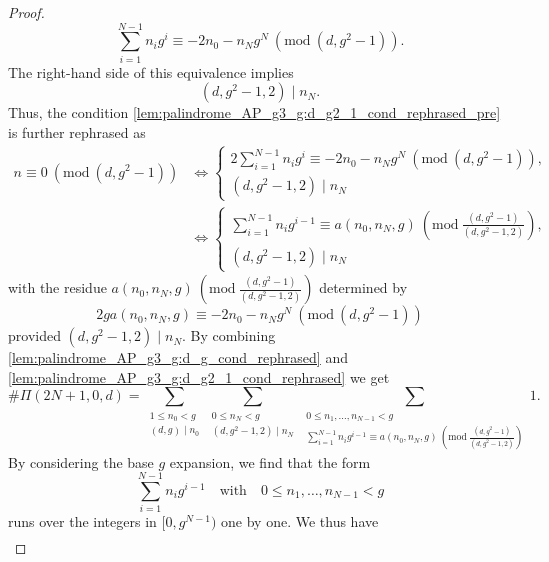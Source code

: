 \documentclass{amsart}
\theoremstyle{plain}
\theoremstyle{definition}
\renewcommand{\mod}[1]{(\mathrm{mod}\ #1)}
\begin{document}
\begin{proof}
\begin{equation}
\sum_{i=1}^{N-1}
n_{i}g^{i}
\equiv
-2n_{0}-n_{N}g^{N}
\ \mod{(d,g^{2}-1)}.
\end{equation}
The right-hand side of this equivalence implies
\begin{equation}
\label{lem:palindrome_AP_g3_g:d_g2_1_cond_nN_cond}
(d,g^{2}-1,2)\mid n_{N}.
\end{equation}
Thus, the condition \cref{lem:palindrome_AP_g3_g:d_g2_1_cond_rephrased_pre} is further rephrased as
\begin{equation}
\label{lem:palindrome_AP_g3_g:d_g2_1_cond_rephrased}
\begin{aligned}
n\equiv0\ \mod{(d,g^{2}-1)}
&\iff
\left\{
\begin{gathered}
2
\sum_{i=1}^{N-1}
n_{i}g^{i}
\equiv
-2n_{0}-n_{N}g^{N}
\ \mod{(d,g^{2}-1)},\\
(d,g^{2}-1,2)\mid n_{N}
\end{gathered}
\right.\\
&\iff
\left\{
\begin{gathered}
\sum_{i=1}^{N-1}
n_{i}g^{i-1}
\equiv
a(n_{0},n_{N},g)
\ \mod{\frac{(d,g^{2}-1)}{(d,g^{2}-1,2)}},\\
(d,g^{2}-1,2)\mid n_{N}
\end{gathered}
\right.
\end{aligned}
\end{equation}
with the residue $a(n_{0},n_{N},g)\ \mod{\frac{(d,g^{2}-1)}{(d,g^{2}-1,2)}}$ determined by
\[
2ga(n_{0},n_{N},g)
\equiv
-2n_{0}-n_{N}g^{N}
\ \mod{(d,g^{2}-1)}
\]
provided $(d,g^{2}-1,2)\mid n_{N}$.
By combining \cref{lem:palindrome_AP_g3_g:d_g_cond_rephrased} and \cref{lem:palindrome_AP_g3_g:d_g2_1_cond_rephrased}
we get
\begin{equation}
\label{lem:palindrome_AP_g3_g:first_reduction}
\#\Pi(2N+1,0,d)
=
\sum_{\substack{
1\le n_{0}<g\\
(d,g)\mid n_{0}
}}
\sum_{\substack{
0\le n_{N}<g\\
(d,g^{2}-1,2)\mid n_{N}
}}
\sum_{\substack{
0\le n_{1},\ldots,n_{N-1}<g\\
\sum_{i=1}^{N-1}
n_{i}g^{i-1}
\equiv
a(n_{0},n_{N},g)
\ \mod{\frac{(d,g^{2}-1)}{(d,g^{2}-1,2)}}
}}
1.
\end{equation}
By considering the base $g$ expansion, we find that the form
\[
\sum_{i=1}^{N-1}
n_{i}g^{i-1}
\quad\text{with}\quad
0\le n_{1},\ldots,n_{N-1}<g
\]
runs over the integers in $[0,g^{N-1})$ one by one.
We thus have
\begin{equation}
\label{lem:palindrome_AP_g3_g:after_folding_base_g_expansion}
\begin{aligned}

\end{aligned}
\end{equation}
\end{proof}
\end{document}

